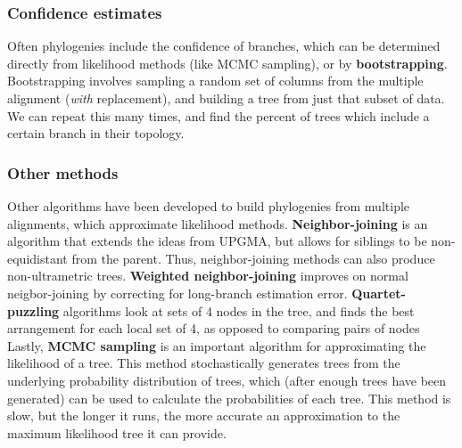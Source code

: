 \documentclass[12pt]{article}
\begin{document}
\subsubsection{Confidence estimates}
Often phylogenies include the confidence of branches, which can be determined directly from likelihood methods (like MCMC sampling), or by \textbf{bootstrapping}. Bootstrapping involves sampling a random set of columns from the multiple alignment (\textit{with} replacement), and building a tree from just that subset of data. We can repeat this many times, and find the percent of trees which include a certain branch in their topology. 

\subsubsection{Other methods}
Other algorithms have been developed to build phylogenies from multiple alignments, which approximate likelihood methods. \textbf{Neighbor-joining} is an algorithm that extends the ideas from UPGMA, but allows for siblings to be non-equidistant from the parent. Thus, neighbor-joining methods can also produce non-ultrametric trees. \textbf{Weighted neighbor-joining} improves on normal neigbor-joining by correcting for long-branch estimation error. \textbf{Quartet-puzzling} algorithms look at sets of 4 nodes in the tree, and finds the best arrangement for each local set of 4, as opposed to comparing pairs of nodes \\[10pt]
Lastly, \textbf{MCMC sampling} is an important algorithm for approximating the likelihood of a tree. This method stochastically generates trees from the underlying probability distribution of trees, which (after enough trees have been generated) can be used to calculate the probabilities of each tree. This method is slow, but the longer it runs, the more accurate an approximation to the maximum likelihood tree it can provide.
\end{document}
